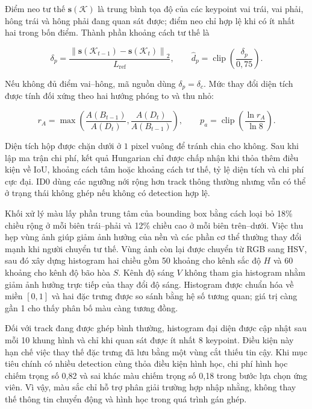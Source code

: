 Điểm neo tư thế $\mathbf{s}(\mathcal K)$ là trung bình tọa độ của các keypoint vai trái, vai phải, hông trái và hông phải đang quan sát được; điểm neo chỉ hợp lệ khi có ít nhất hai trong bốn điểm. Thành phần khoảng cách tư thế là

\begin{equation}
\delta_p=\frac{\left\lVert\mathbf{s}(\mathcal K_{t-1})-\mathbf{s}(\mathcal K_t)\right\rVert_2}{L_{\mathrm{ref}}},
\qquad
\hat d_p=\operatorname{clip}\!\left(\frac{\delta_p}{0{,}75}\right).
\label{eq:tracking_pose_distance}
\end{equation}

Nếu không đủ điểm vai--hông, mã nguồn dùng $\delta_p=\delta_c$. Mức thay đổi diện tích được tính đối xứng theo hai hướng phóng to và thu nhỏ:

\begin{equation}
r_A=\max\!\left(\frac{A(B_{t-1})}{A(D_t)},\frac{A(D_t)}{A(B_{t-1})}\right),
\qquad
p_a=\operatorname{clip}\!\left(\frac{\ln r_A}{\ln 8}\right).
\label{eq:tracking_area_penalty}
\end{equation}

Diện tích hộp được chặn dưới ở $1$ pixel vuông để tránh chia cho không. Sau khi lập ma trận chi phí, kết quả Hungarian chỉ được chấp nhận khi thỏa thêm điều kiện về IoU, khoảng cách tâm hoặc khoảng cách tư thế, tỷ lệ diện tích và chi phí cực đại. ID0 dùng các ngưỡng nới rộng hơn track thông thường nhưng vẫn có thể ở trạng thái không ghép nếu không có detection hợp lệ.

Khối xử lý màu lấy phần trung tâm của bounding box bằng cách loại bỏ 18\% chiều rộng ở mỗi biên trái--phải và 12\% chiều cao ở mỗi biên trên--dưới. Việc thu hẹp vùng ảnh giúp giảm ảnh hưởng của nền và các phần cơ thể thường thay đổi mạnh khi người chuyển tư thế. Vùng ảnh còn lại được chuyển từ RGB sang HSV, sau đó xây dựng histogram hai chiều gồm 50 khoảng cho kênh sắc độ $H$ và 60 khoảng cho kênh độ bão hòa $S$. Kênh độ sáng $V$ không tham gia histogram nhằm giảm ảnh hưởng trực tiếp của thay đổi độ sáng. Histogram được chuẩn hóa về miền $[0,1]$ và hai đặc trưng được so sánh bằng hệ số tương quan; giá trị càng gần 1 cho thấy phân bố màu càng tương đồng.

Đối với track đang được ghép bình thường, histogram đại diện được cập nhật sau mỗi 10 khung hình và chỉ khi quan sát được ít nhất 8 keypoint. Điều kiện này hạn chế việc thay thế đặc trưng đã lưu bằng một vùng cắt thiếu tin cậy. Khi mục tiêu chính có nhiều detection cùng thỏa điều kiện hình học, chi phí hình học chiếm trọng số 0,82 và sai khác màu chiếm trọng số 0,18 trong bước lựa chọn ứng viên. Vì vậy, màu sắc chỉ hỗ trợ phân giải trường hợp nhập nhằng, không thay thế thông tin chuyển động và hình học trong quá trình gán ghép.


